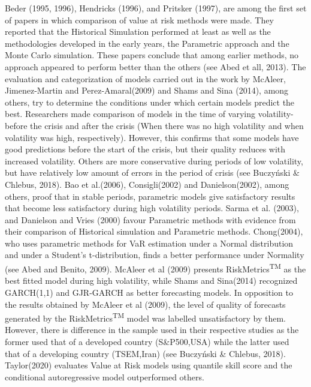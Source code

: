 \documentclass[a4paper,11pt,oneside]{book}
\begin{document}
Beder (1995, 1996), Hendricks (1996), and
Pritsker (1997), are among the first set of papers in which comparison of value at risk methods were made. They reported that the Historical Simulation performed at least as well as the methodologies developed in the early years, the Parametric approach and the Monte Carlo simulation. These papers conclude that among earlier methods, no approach appeared to perform better than the
others (see Abed et all, 2013). The evaluation and categorization of models carried out in the work by McAleer, Jimenez-Martin and Perez-Amaral(2009) and Shams and Sina (2014), among others, try to determine the conditions under which certain models predict the best. Researchers made comparison of models in the time of varying volatility-before the crisis and after the crisis (When there was no high volatility and when volatility was high, respectively). However, this confirms that some models have good predictions before the start of the crisis, but their quality reduces with increased volatility. Others are more conservative during periods of low volatility, but have relatively low amount of errors in the period of crisis (see Buczyński \& Chlebus, 2018).
\newline\newline
Bao et al.(2006), Consigli(2002) and Danielson(2002), among
others, proof that in stable periods, parametric models give satisfactory results
that become less satisfactory during high volatility periods. Sarma et al. (2003), and Danielson and Vries (2000) favour Parametric methods with evidence from their comparison of Historical simulation and Parametric methods. Chong(2004),
who uses parametric methods for VaR estimation under a Normal distribution and under a
Student’s t-distribution, finds a better performance under Normality (see Abed and Benito, 2009). McAleer et al (2009) presents RiskMetrics\textsuperscript{TM} as
the best fitted model during high volatility, while Shams and Sina(2014) recognized GARCH(1,1) and GJR-GARCH as better
forecasting models. In opposition to the results obtained
by McAleer et al (2009), the level of quality of forecasts
generated by the RiskMetrics\textsuperscript{TM} model was labelled
unsatisfactory by them. However, there is difference in the sample used in their respective studies as the former used that of a developed country (S\&P500,USA) while the latter used that of a developing  country (TSEM,Iran) (see Buczyński \& Chlebus, 2018). Taylor(2020) evaluates Value at Risk models using quantile skill score and the conditional autoregressive model outperformed others.
\end{document}
